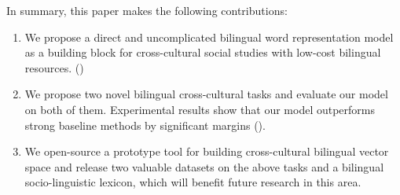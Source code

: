 %
In summary, this paper makes the following contributions:
\begin{enumerate}
\item We propose a direct and uncomplicated bilingual word representation model as a building block
for cross-cultural social studies with low-cost bilingual resources. ()
\item We propose two novel bilingual cross-cultural tasks and evaluate our model on both of them. Experimental results
show that our model outperforms strong baseline methods by significant margins
(). 
\item We open-source a prototype tool for building cross-cultural bilingual 
vector space and release two valuable datasets on the above tasks and 
a bilingual socio-linguistic lexicon, which will benefit future research 
in this area. 
\end{enumerate}
